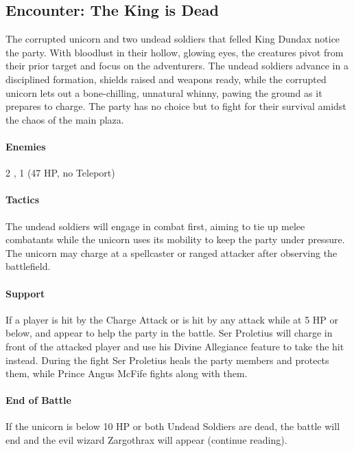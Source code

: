 \subsection*{Encounter: The King is Dead}
{\entryfont The corrupted unicorn and two undead soldiers that felled King Dundax  notice the party. With bloodlust in their hollow, glowing eyes, the creatures pivot from their prior target and focus on the adventurers. The undead soldiers advance in a disciplined formation, shields raised and weapons ready, while the corrupted unicorn lets out a bone-chilling, unnatural whinny, pawing the ground as it prepares to charge. The party has no choice but to fight for their survival amidst the chaos of the main plaza.

\paragraph*{Enemies} 2 \hyperref[monster:UndeadSoldier]{}, 1 \hyperref[monster:CorruptedUnicorn]{} (47 HP, no Teleport)

\paragraph*{Tactics} The undead soldiers will engage in combat first, aiming to tie up melee combatants while the unicorn uses its mobility to keep the party under pressure. The unicorn may charge at a spellcaster or ranged attacker after observing the battlefield.

\paragraph*{Support} If a player is hit by the Charge Attack or is hit by any attack while at 5 HP or below, \hyperref[char:SerProletius]{} and \hyperref[char:AngusMcFife]{} appear to help the party in the battle. Ser Proletius will charge in front of the attacked player and use his Divine Allegiance feature to take the hit instead. During the fight Ser Proletius heals the party members and protects them, while Prince Angus McFife fights along with them.

\paragraph*{End of Battle} If the unicorn is below 10 HP or both Undead Soldiers are dead, the battle will end and the evil wizard Zargothrax will appear (continue reading).
}

